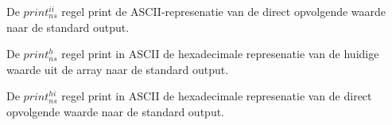 \documentclass[11pt]{article}
\begin{document}
De $print^{ii}_{ns}$ regel print de ASCII-represenatie van de direct opvolgende waarde naar de standard output.
\begin{prooftree}
\end{prooftree}

De $print^h_{ns}$ regel print in ASCII de hexadecimale represenatie van de huidige waarde uit de array naar de standard output.
\begin{prooftree}
\end{prooftree}

De $print^{hi}_{ns}$ regel print in ASCII de hexadecimale represenatie van de direct opvolgende waarde naar de standard output.
\begin{prooftree}
\end{prooftree}




%
\end{document}
